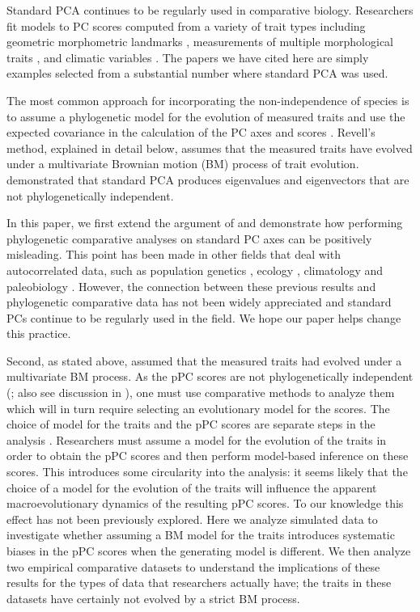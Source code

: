\documentclass[a4paper,11pt]{article}
\begin{document}
Standard PCA continues to be regularly used in comparative biology. Researchers fit models to PC scores computed from a variety of trait types including geometric morphometric landmarks \citep[e.g.,][]{Dornburg2011, Hunt2013}, measurements of multiple morphological traits \citep[e.g.,][]{Harmon2010, Weir2012, Pienaar2013, Price2014}, and climatic variables \citep[e.g.,][]{KozakWiens2010, Schnitzler2012}. The papers we have cited here are simply examples selected from a substantial number where standard PCA was used.

The most common approach for incorporating the non-independence of species is to assume a phylogenetic model for the evolution of measured traits and use the expected covariance in the calculation of the PC axes and scores \citep[phylogenetic principal components analysis, or pPCA;][]{Revell2008}. Revell's method, explained in detail below, assumes that the measured traits have evolved under a multivariate Brownian motion (BM) process of trait evolution. \citet{Revell2008} demonstrated that standard PCA produces eigenvalues and eigenvectors that are not phylogenetically independent. 

In this paper, we first extend the argument of \citet{Revell2008} and demonstrate how performing phylogenetic comparative analyses on standard PC axes can be positively misleading. This point has been made in other fields that deal with autocorrelated data, such as population genetics \citep{Novembre}, ecology \citep{Podani2002}, climatology \citep{Richman1986} and paleobiology \citep{Bookstein2012}. However, the connection between these previous results and phylogenetic comparative data has not been widely appreciated and standard PCs continue to be regularly used in the field. We hope our paper helps change this practice.

Second, as stated above, \citet{Revell2008} assumed that the measured traits had evolved under a multivariate BM process. As the pPC scores are not phylogenetically independent (\citealp{Revell2008}; also see discussion in \citealp{Polly2013}), one must use comparative methods to analyze them which will in turn require selecting an evolutionary model for the scores. The choice of model for the traits and the pPC scores are separate steps in the analysis \citep{Revell2008}. Researchers must assume a model for the evolution of the traits in order to obtain the pPC scores and then perform model-based inference on these scores. This introduces some circularity into the analysis: it seems likely that the choice of a model for the evolution of the traits will influence the apparent macroevolutionary dynamics of the resulting pPC scores. To our knowledge this effect has not been previously explored. Here we analyze simulated data to investigate whether assuming a BM model for the traits introduces systematic biases in the pPC scores when the generating model is different. We then analyze two empirical comparative datasets to understand the implications of these results for the types of data that researchers actually have; the traits in these datasets have certainly not evolved by a strict BM process.
\end{document}
